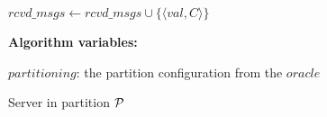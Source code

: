 \begin{algorithm}[h!]
\begin{distribalgo}[1]
\vspace{1.0mm}
    \STATE $rcvd\_msgs \leftarrow rcvd\_msgs \cup \{\langle val, C \rangle\}$
\ENDINDENT

\vspace{1.5mm}

\textbf{Algorithm variables:}

\vspace{1mm}

$partitioning$: the partition configuration from the $oracle$



\caption{Server in partition $\mathcal{P}$}
\label{alg:dynastar-server_proxy}
\end{distribalgo}
\end{algorithm}
